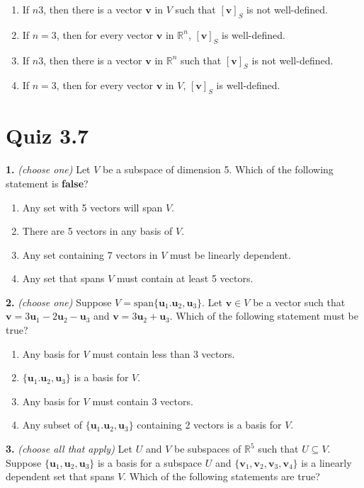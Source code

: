 \documentclass[10pt,a4paper]{article}
\begin{document}
\begin{enumerate}[label=(\Alph*)]
\item If \(n3\), then there is a vector \(\mathbf{v}\) in \(V\) such that \([\mathbf{v}]_S\) is not well-defined.
\item If \(n=3\), then for every vector \(\mathbf{v}\) in \(\mathbb{R}^n\), \([\mathbf{v}]_S\) is well-defined.
\item If \(n3\), then there is a vector \(\mathbf{v}\) in \(\mathbb{R}^n\) such that \([\mathbf{v}]_S\) is not well-defined.
\item If \(n=3\), then for every vector \(\mathbf{v}\) in \(V\), \([\mathbf{v}]_S\) is well-defined.
\end{enumerate}
\smallskip
\section{Quiz 3.7}
\textbf{1.} \textit{(choose one)} Let \(V\) be a subspace of dimension 5. Which of the following statement is \textbf{false}?

\begin{enumerate}[label=(\Alph*)]
\item Any set with 5 vectors will span \(V\).
\item There are 5 vectors in any basis of \(V\).
\item Any set containing 7 vectors in \(V\) must be linearly dependent.
\item Any set that spans \(V\) must contain at least 5 vectors.
\end{enumerate}
\smallskip
\textbf{2.} \textit{(choose one)} Suppose \(V=\text{span}\{\mathbf{u}_1.\mathbf{u}_2,\mathbf{u}_3\}\). Let \(\mathbf{v}\in V\) be a vector such that \(\mathbf{v}=3\mathbf{u}_1-2\mathbf{u}_2-\mathbf{u}_3\) and \(\mathbf{v}=3\mathbf{u}_2+\mathbf{u}_3\). Which of the following statement must be true?

\begin{enumerate}[label=(\Alph*)]
\item Any basis for \(V\) must contain less than 3 vectors.
\item \(\{\mathbf{u}_1.\mathbf{u}_2,\mathbf{u}_3\}\) is a basis for \(V\).
\item Any basis for \(V\) must contain 3 vectors.
\item Any subset of \(\{\mathbf{u}_1.\mathbf{u}_2,\mathbf{u}_3\}\) containing 2 vectors is a basis for \(V\).
\end{enumerate}
\smallskip
\textbf{3.} \textit{(choose all that apply)} Let \(U\) and \(V\) be subspaces of \(\mathbb{R}^5\) such that \(U\subseteq V\). Suppose \(\{\mathbf{u}_1,\mathbf{u}_2,\mathbf{u}_3\}\) is a basis for a subspace \(U\) and \(\{\mathbf{v}_1,\mathbf{v}_2,\mathbf{v}_3,\mathbf{v}_4\}\) is a linearly dependent set that spans \(V\). Which of the following statements are true?
\end{document}
